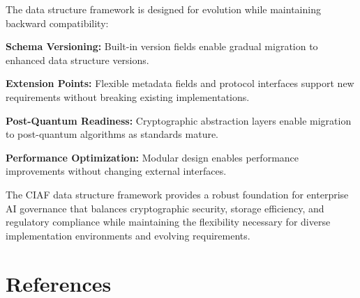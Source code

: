 \documentclass[12pt,a4paper]{article}
\begin{document}
The data structure framework is designed for evolution while maintaining backward compatibility:

\textbf{Schema Versioning:} Built-in version fields enable gradual migration to enhanced data structure versions.

\textbf{Extension Points:} Flexible metadata fields and protocol interfaces support new requirements without breaking existing implementations.

\textbf{Post-Quantum Readiness:} Cryptographic abstraction layers enable migration to post-quantum algorithms as standards mature.

\textbf{Performance Optimization:} Modular design enables performance improvements without changing external interfaces.

The CIAF data structure framework provides a robust foundation for enterprise AI governance that balances cryptographic security, storage efficiency, and regulatory compliance while maintaining the flexibility necessary for diverse implementation environments and evolving requirements.

\newpage

\section*{References}
\end{document}
